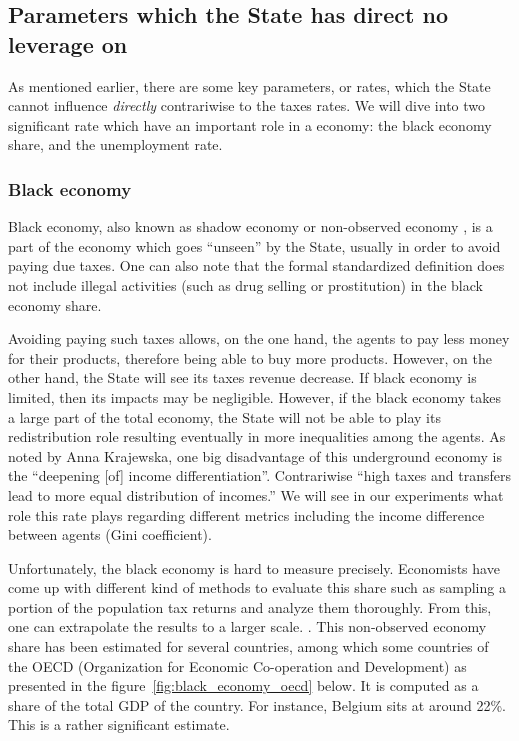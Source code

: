 \subsection{Parameters which the State has direct no leverage on}
    
    As mentioned earlier, there are some key parameters, or rates, which the State cannot influence \emph{directly} contrariwise to the taxes rates. We will dive into two significant rate which have an important role in a economy: the black economy share, and the unemployment rate.

    \subsubsection{Black economy}
    Black economy, also known as shadow economy or non-observed economy \cite{oecdBlack}, is a part of the economy which goes ``unseen'' by the State, usually in order to avoid paying due taxes. One can also note that the formal standardized definition does not include illegal activities (such as drug selling or prostitution) in the black economy share. \cite{pyle1989tax} 
    
    Avoiding paying such taxes allows, on the one hand, the agents to pay less money for their products, therefore being able to buy more products. However, on the other hand, the State will see its taxes revenue decrease. 
    If black economy is limited, then its impacts may be negligible. However, if the black economy takes a large part of the total economy, the State will not be able to play its redistribution role resulting eventually in more inequalities among the agents. As noted by Anna Krajewska, one big disadvantage of this underground economy is the ``deepening [of] income differentiation''. Contrariwise ``high  taxes  and  transfers  lead  to  more  equal  distribution  of incomes.'' \cite{blackEcoImpact} We will see in our experiments what role this rate plays regarding different metrics including the income difference between agents (Gini coefficient).

    Unfortunately, the black economy is hard to measure precisely. Economists have come up with different kind of methods to evaluate this share such as sampling a portion of the population tax returns and analyze them thoroughly. From this, one can extrapolate the results to a larger scale. \cite{pyle1989tax}. This non-observed economy share has been estimated for several countries, among which some countries of the OECD (Organization for Economic Co-operation and Development) as presented in the figure~\ref{fig:black_economy_oecd} below. It is computed as a share of the total GDP of the country. For instance, Belgium sits at around 22\%. This is a rather significant estimate.
    
